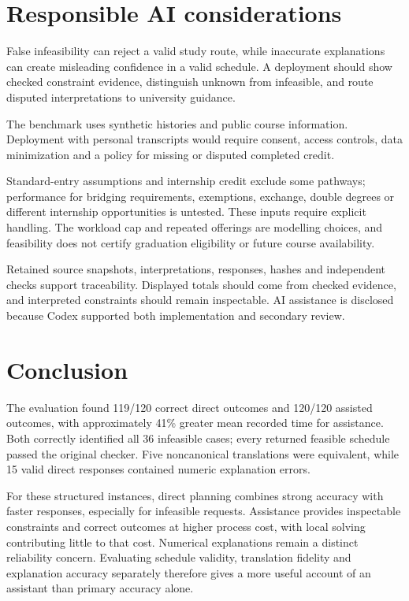 \documentclass[11pt,a4paper]{article}
\begin{document}
\par
\section{Responsible AI considerations}
False infeasibility can reject a valid study route, while inaccurate
explanations can create misleading confidence in a valid schedule.
A deployment should show checked constraint evidence, distinguish unknown
from infeasible, and route disputed interpretations to university guidance.

The benchmark uses synthetic histories and public course information.
Deployment with personal transcripts would require consent, access controls,
data minimization and a policy for missing or disputed completed credit.

Standard-entry assumptions and internship credit exclude some pathways;
performance for bridging requirements, exemptions, exchange, double degrees
or different internship opportunities is untested. These inputs require
explicit handling. The workload cap and repeated offerings are modelling
choices, and feasibility does not certify graduation eligibility or future
course availability.

Retained source snapshots, interpretations, responses, hashes and independent
checks support traceability. Displayed totals should come from checked
evidence, and interpreted constraints should remain inspectable. AI assistance
is disclosed because Codex supported both implementation and secondary review.

\section{Conclusion}
The evaluation found 119/120 correct direct outcomes and 120/120 assisted
outcomes, with approximately 41\% greater mean recorded time for assistance.
Both correctly identified all 36 infeasible cases; every returned feasible
schedule passed the original checker. Five noncanonical translations were
equivalent, while 15 valid direct responses contained numeric explanation errors.

For these structured instances, direct planning combines strong accuracy
with faster responses, especially for infeasible requests. Assistance
provides inspectable constraints and correct outcomes at higher process
cost, with local solving contributing little to that cost. Numerical
explanations remain a distinct reliability concern. Evaluating schedule
validity, translation fidelity and explanation accuracy separately therefore
gives a more useful account of an assistant than primary accuracy alone.
\end{document}

